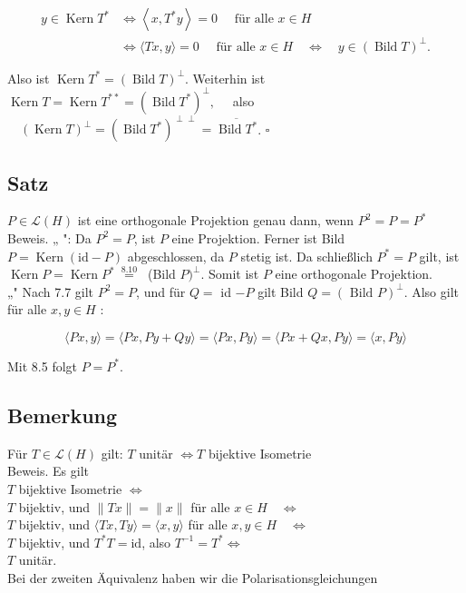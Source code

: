 \documentclass[10pt, letterpaper]{article}
\begin{document}
$$
\begin{aligned}
y \in \operatorname{Kern} T^{*} & \Longleftrightarrow\left\langle x, T^{*} y\right\rangle=0 \quad \text { für alle } x \in H \\
& \Longleftrightarrow\langle T x, y\rangle=0 \quad \text { für alle } x \in H \quad \Longleftrightarrow \quad y \in(\operatorname{Bild} T)^{\perp} .
\end{aligned}
$$

Also ist $\operatorname{Kern} T^{*}=(\operatorname{Bild} T)^{\perp}$. Weiterhin ist\\
$\operatorname{Kern} T=\operatorname{Kern} T^{* *}=\left(\operatorname{Bild} T^{*}\right)^{\perp}, \quad$ also $\quad(\operatorname{Kern} T)^{\perp}=\left(\operatorname{Bild} T^{*}\right)^{\perp \perp}=\overline{\operatorname{Bild} T^{*}}$. \(\square\)

\subsection*{Satz}
$P \in \mathcal{L}(H)$ ist eine orthogonale Projektion genau dann, wenn $P^{2}=P=P^{*}$\\
Beweis. „ ": Da $P^{2}=P$, ist $P$ eine Projektion. Ferner ist Bild $P=\operatorname{Kern}(\mathrm{id}-P)$ abgeschlossen, da $P$ stetig ist. Da schließlich $P^{*}=P$ gilt, ist $\operatorname{Kern} P=\operatorname{Kern} P^{*} \stackrel{\text { 8.10 }}{=}$ (Bild $P)^{\perp}$. Somit ist $P$ eine orthogonale Projektion.\\
„" Nach 7.7 gilt $P^{2}=P$, und für $Q=$ id $-P$ gilt Bild $Q=(\text { Bild } P)^{\perp}$. Also gilt für alle $x, y \in H$ :

$$
\langle P x, y\rangle=\langle P x, P y+Q y\rangle=\langle P x, P y\rangle=\langle P x+Q x, P y\rangle=\langle x, P y\rangle
$$

Mit 8.5 folgt $P=P^{*}$.

\subsection*{Bemerkung}
Für $T \in \mathcal{L}(H)$ gilt: $T$ unitär $\Longleftrightarrow T$ bijektive Isometrie\\
Beweis. Es gilt\\
$T$ bijektive Isometrie $\Longleftrightarrow$\\
$T$ bijektiv, und $\|T x\|=\|x\|$ für alle $x \in H \quad \Longleftrightarrow$\\
$T$ bijektiv, und $\langle T x, T y\rangle=\langle x, y\rangle$ für alle $x, y \in H \quad \Longleftrightarrow$\\
$T$ bijektiv, und $T^{*} T=\mathrm{id}$, also $T^{-1}=T^{*} \Longleftrightarrow$\\
$T$ unitär.\\
Bei der zweiten Äquivalenz haben wir die Polarisationsgleichungen
\end{document}
